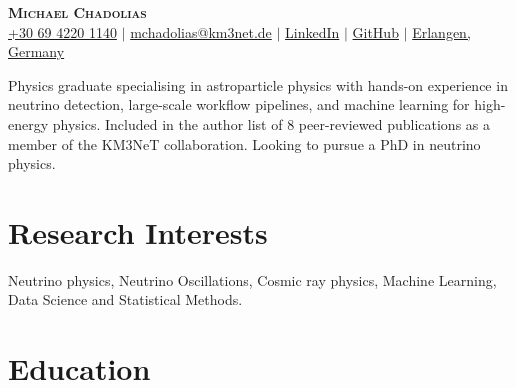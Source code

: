 \documentclass[letterpaper,11pt]{article}
\begin{document}

\begin{center}
    \textbf{\Huge \scshape Michael Chadolias} \\ \vspace{3pt}
    \small
    \faMobile \hspace{.5pt} \href{tel:00306942201140}{+30 69 4220 1140}
    $|$
    \faAt \hspace{.5pt} \href{mailto:mchadolias@km3net.de}{mchadolias@km3net.de}
    $|$
    \faLinkedinSquare \hspace{.5pt} \href{https://www.linkedin.com/in/michael-chadolias/}{LinkedIn}
    $|$
    \faGithub \hspace{.5pt} \href{https://github.com/mchadolias}{GitHub}
    $|$
    \faMapMarker \hspace{.5pt} \href{https://www.google.com/maps/place/Erlangen/@49.5892592,10.9020837,12z/data=!3m1!4b1!4m6!3m5!1s0x47a1f8c7d57c34a1:0x41eda32beb5c7d0!8m2!3d49.5896744!4d11.0119611!16zL20vMDFjel8x?entry=ttu}{Erlangen, Germany}
\end{center}

Physics graduate specialising in astroparticle physics with hands-on experience in neutrino detection, large-scale workflow pipelines, and machine learning for high-energy physics. Included in the author list of 8 peer-reviewed publications as a member of the KM3NeT collaboration. Looking to pursue a PhD in neutrino physics.
\vspace{1.5pt}


\section{Research Interests}
  \vspace{2pt}
  \resumeSubHeadingListStart
    \small{\item{
        {Neutrino physics, Neutrino Oscillations, Cosmic ray physics, Machine Learning, Data Science and Statistical Methods.} 
    }}
  \resumeSubHeadingListEnd

\section{Education}
  \vspace{3pt}
  \resumeSubHeadingListStart
    
\end{document}
